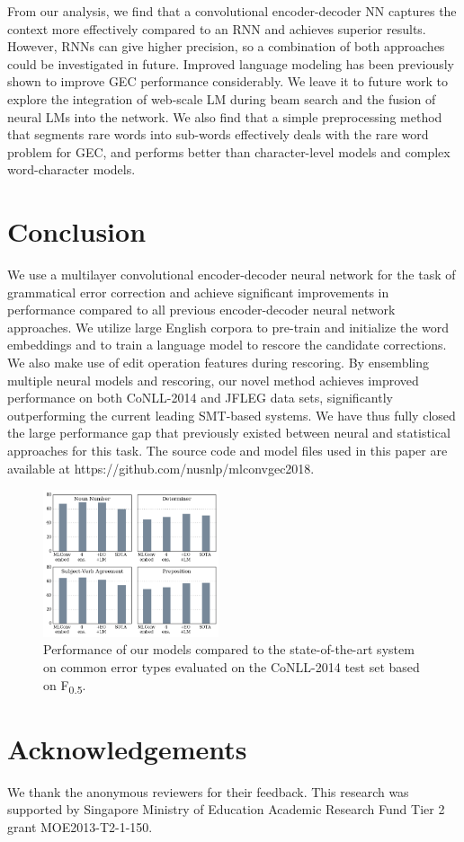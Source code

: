 \documentclass[letterpaper]{article} %
\begin{document}
From our analysis, we find that a convolutional encoder-decoder NN captures the context more effectively compared to an RNN and achieves superior results. However, RNNs can give higher precision, so a combination of both approaches could be investigated in future. Improved language modeling has been previously shown to improve GEC performance considerably. We leave it to future work to explore the integration of web-scale LM during beam search and the fusion of neural LMs into the network. We also find that a simple preprocessing method that segments rare words into sub-words effectively deals with the rare word problem for GEC, and performs better than character-level models and complex word-character models. 

\section{Conclusion}
We use a multilayer convolutional encoder-decoder neural network for the task of grammatical error correction and achieve significant improvements in performance compared to all previous encoder-decoder neural network approaches. We utilize large English corpora to pre-train and initialize the word embeddings and to train a language model to rescore the candidate corrections. We also make use of edit operation features during rescoring. By ensembling multiple neural models and rescoring, our novel method achieves improved performance on both CoNLL-2014 and JFLEG data sets, significantly outperforming the current leading SMT-based systems. We have thus fully closed the large performance gap that previously existed between neural and statistical approaches for this task. The source code and model files used in this paper are available at https://github.com/nusnlp/mlconvgec2018.

\begin{figure}[t]
  \includegraphics[width=0.46\textwidth]{img/etype.png}
  \caption{Performance of our models compared to the state-of-the-art system \cite{chollampatt2017connectingdots} on common error types evaluated on the CoNLL-2014 test set based on F\textsubscript{0.5}.}
  \label{fig:etypescores}
\end{figure}

\section*{Acknowledgements}
We thank the anonymous reviewers for their feedback. This research was supported by
Singapore Ministry of Education Academic Research
Fund Tier 2 grant MOE2013-T2-1-150.



\end{document}
